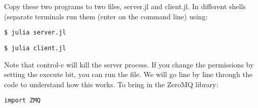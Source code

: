 \begin{Shaded}
\begin{Highlighting}[]

\CommentTok{\#}
\CommentTok{\#}


\OperatorTok{=}

\NormalTok{)}
\OperatorTok{=}\OperatorTok{,}
\OperatorTok{,} \NormalTok{)}

 \OperatorTok{:}
\NormalTok{)}
\OperatorTok{,} \NormalTok{)}

\OperatorTok{=} 
\NormalTok{)}

\end{Highlighting}
\end{Shaded}

Copy these two programs to two files, server.jl and client.jl. In
different shells (separate terminals run them (enter on the command
line) using:

\begin{verbatim}
$ julia server.jl
\end{verbatim}

\begin{verbatim}
$ julia client.jl
\end{verbatim}

Note that control-c will kill the server process. If you change the
permissions by setting the execute bit, you can run the file. We will go
line by line through the code to understand how this works. To bring in
the ZeroMQ library:

\begin{verbatim}
import ZMQ
\end{verbatim}

